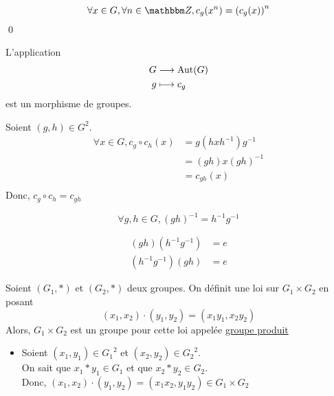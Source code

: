 \begin{crlr}
	\[
	\forall x \in G, \forall n \in \Z, c_g(x^n) = \left( c_g(x) \right) ^n
	\] 
	\qed
\end{crlr}

\begin{prop}
	L'application
	\begin{align*}
		G &\longrightarrow \operatorname{Aut}(G) \\
		g &\longmapsto c_g
	\end{align*}
	est un morphisme de groupes.
\end{prop}

\begin{prv}
	Soient $(g,h)\in G^2$.\\
	\begin{align*}
		\forall x \in G, c_g \circ c_h(x) &= g\left( hxh^{-1} \right) g^{-1} \\
		&= (gh)x(gh)^{-1} \\
		&= c_{gh}(x) \\
	\end{align*}
	Donc, $c_g \circ c_h = c_{gh}$
\end{prv}

\begin{prop}
	[Rappel]
	\[
	\forall g,h \in G, (gh)^{-1} = h^{-1} g^{-1}
	\]
\end{prop}

\begin{prv}
	\begin{align*}
		(gh)\left( h^{-1}g^{-1} \right) &= e\\
		\left( h^{-1}g^{-1} \right) (gh) &= e
	\end{align*}
\end{prv}

\begin{prop-defn}
	Soient $(G_1, *)$ et $(G_2, *)$ deux groupes. On définit une loi sur $G_1\times G_2$ en posant \[
		\left(x_1,x_2\right) \cdot \left( y_1,y_2 \right) = \left( x_1y_1,x_2y_2 \right)
	\] 
	Alors, $G_1\times G_2$ est un groupe pour cette loi appelée \underline{groupe produit}
\end{prop-defn}

\begin{prv}
	\begin{itemize}
		\item 
			Soient $(x_1,y_1) \in {G_1}^2$ et $(x_2, y_2) \in {G_2}^2$.\\
			On sait que $x_1 * y_1 \in G_1$ et que $x_2 * y_2 \in G_2$.\\
			Donc, $(x_1,x_2) \cdot (y_1, y_2) = (x_1x_2, y_1y_2) \in G_1\times G_2$
	\end{itemize}
\end{prv}
